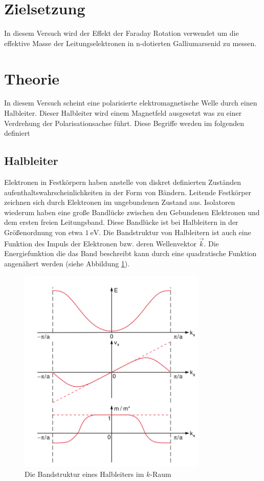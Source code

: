 \section{Zielsetzung}
In diesem Versuch wird der Effekt der Faraday Rotation verwendet um die
effektive Masse der Leitungselektronen in n-dotierten Galliumarsenid zu messen.

\section{Theorie}
In diesem Versuch scheint eine polarisierte elektromagnetische Welle durch
einen Halbleiter. Dieser Halbleiter wird einem Magnetfeld ausgesetzt was zu
einer Verdrehung der Polarisationsachse führt. Diese Begriffe werden im
folgenden definiert

\subsection{Halbleiter \cite[][Kap. 14]{book:expi3}}
Elektronen in Festkörpern haben anstelle von diskret definierten Zuständen
aufenthaltswahrscheinlichkeiten in der Form von Bändern. Leitende Festkörper
zeichnen sich durch Elektronen im ungebundenen Zustand aus. Isolatoren wiederum
haben eine große Bandlücke zwischen den Gebundenen Elektronen und dem ersten
freien Leitungsband. Diese Bandlücke ist bei Halbleitern in der Größenordnung
von etwa $\qty{1}{\eV}$. Die Bandstruktur von Halbleitern ist auch eine Funktion
des Impuls der Elektronen bzw. deren Wellenvektor $\vec{k}$.
Die Energiefunktion die das Band beschreibt kann durch eine quadratische Funktion angenähert werden
(siehe Abbildung \ref{fig:band}).
\begin{figure}
    \centering
    \includegraphics[width=0.8\textwidth]{./Bilder/bandstrukt.png}
    \caption{Die Bandstruktur eines Halbleiters im $k$-Raum}\label{fig:band}
\end{figure}


